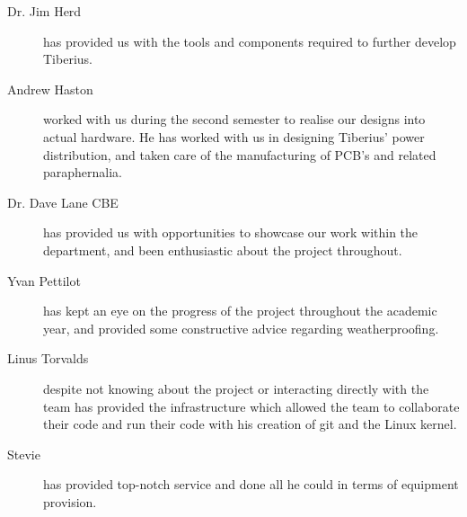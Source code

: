 \begin{description}
\item [Dr. Jim Herd] has provided us with the tools and components required to further develop Tiberius.

\item [Andrew Haston] worked with us during the second semester to realise our designs into actual hardware. He has worked with us in designing Tiberius' power distribution, and taken care of the manufacturing of PCB's and related paraphernalia.

\item [Dr. Dave Lane CBE] has provided us with opportunities to showcase our work within the department, and been enthusiastic about the project throughout.

\item [Yvan Pettilot] has kept an eye on the progress of the project throughout the academic year, and provided some constructive advice regarding weatherproofing.

\item [Linus Torvalds] despite not knowing about the project or interacting directly with the team has provided the infrastructure which allowed the team to collaborate their code and run their code with his creation of git and the Linux kernel.

\item [Stevie] has provided top-notch service and done all he could in terms of equipment provision.

\end{description}
